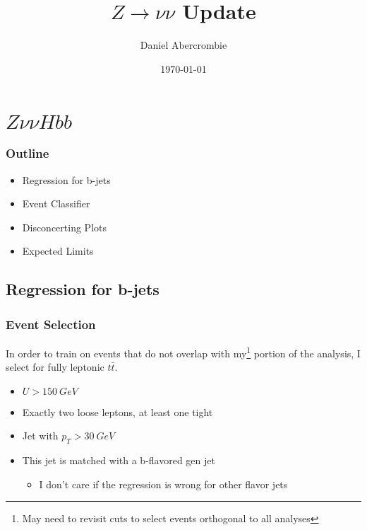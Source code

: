 \documentclass{beamer}
\author[D. Abercrombie]{
  Daniel Abercrombie
}
\title{\bf \sffamily $Z \rightarrow \nu\nu$ Update}
\date{\today}
\newcommand{\ttbar}{\ensuremath{t\bar{t}}}
\begin{document}
\begin{frame}[nonumbering]
  \titlepage
\end{frame}

\section{$Z \nu\nu Hbb$}

\begin{frame}
  \frametitle{Outline}

  \begin{itemize}
  \item Regression for b-jets
  \item Event Classifier
  \item Disconcerting Plots
  \item Expected Limits
  \end{itemize}

\end{frame}

\subsection{Regression for b-jets}

\begin{frame}
  \frametitle{Event Selection}
  In order to train on events that do not overlap with
  my\footnote{May need to revisit cuts to select events orthogonal to all analyses}
  portion of the analysis,
  I select for fully leptonic \ttbar.
  
  \begin{itemize}
  \item $U > \SI{150}{GeV}$
  \item Exactly two loose leptons, at least one tight
  \item Jet with $p_T > \SI{30}{GeV}$
  \item This jet is matched with a b-flavored gen jet
    \begin{itemize}
    \item I don't care if the regression is wrong for other flavor jets
    \end{itemize}
  \end{itemize}

\end{frame}
\end{document}
